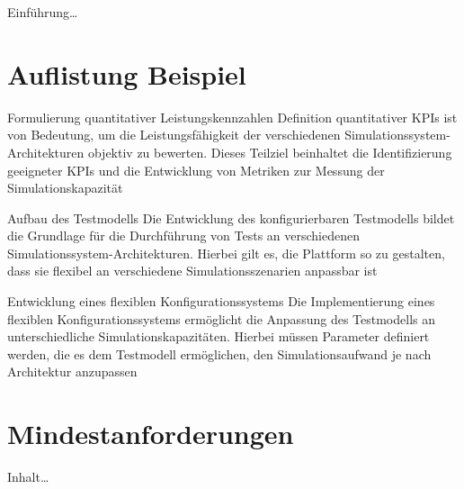 \label{ch_specs}

Einführung\ldots

\section{Auflistung Beispiel}

\begin{Itemize}
  \item Formulierung quantitativer Leistungskennzahlen
  \newline
  Definition quantitativer KPIs ist von Bedeutung, um die Leistungsfähigkeit der
  verschiedenen Simulationssystem-Architekturen objektiv zu bewerten. Dieses Teilziel
  beinhaltet die Identifizierung geeigneter KPIs und die Entwicklung von Metriken zur Messung
  der Simulationskapazität
  \item Aufbau des Testmodells
  \newline
  Die Entwicklung des konfigurierbaren Testmodells bildet die Grundlage für die Durchführung von
  Tests an verschiedenen Simulationssystem-Architekturen. Hierbei gilt es, die Plattform so zu gestalten,
  dass sie flexibel an verschiedene Simulationsszenarien anpassbar ist
  \item Entwicklung eines flexiblen Konfigurationssystems
  \newline
  Die Implementierung eines flexiblen Konfigurationssystems ermöglicht die Anpassung des Testmodells an
  unterschiedliche Simulationskapazitäten. Hierbei müssen Parameter definiert werden, die es dem Testmodell
  ermöglichen, den Simulationsaufwand je nach Architektur anzupassen
\end{Itemize}

\section{Mindestanforderungen}

Inhalt\ldots
